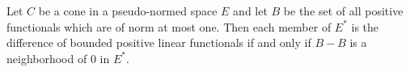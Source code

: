 Let $C$ be a cone in a pseudo-normed space $E$ and let $B$ be the set of all positive functionals which are of norm at most one. Then each member of $E^{*}$ is the difference of bounded positive linear functionals if and only if $B - B$ is a neighborhood of $0$ in $E^{*}$.
